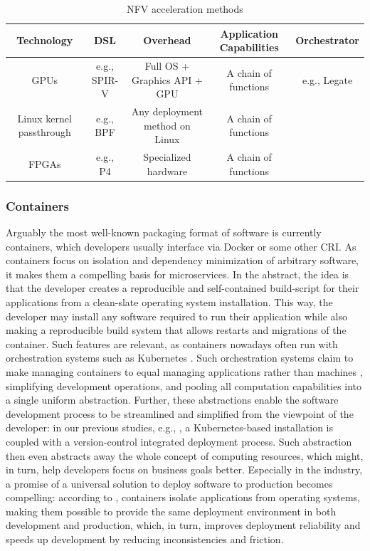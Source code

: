 \documentclass{IEEEtran}
\begin{document}
\begin{table}
\begin{center}
\caption{NFV acceleration methods}
\begin{tabular}{ c|c|c|c|c }
 Technology & DSL & Overhead & Application Capabilities & Orchestrator \\
 \hline
 GPUs & e.g., SPIR-V & Full OS + Graphics API + GPU & A chain of functions & e.g., Legate \cite{bauer2019legate} \\
 Linux kernel passthrough & e.g., BPF & Any deployment method on Linux & A chain of functions &  \\
 FPGAs & e.g., P4 & Specialized hardware & A chain of functions & \\
\end{tabular}
\end{center}
\end{table}

\subsubsection{Containers}

Arguably the most well-known packaging format of software is currently containers, which developers usually interface via Docker or some other \gls{CRI}. As containers focus on isolation and dependency minimization of arbitrary software, it makes them a compelling basis for microservices. In the abstract, the idea is that the developer creates a reproducible and self-contained build-script for their applications from a clean-slate operating system installation. This way, the developer may install any software required to run their application while also making a reproducible build system that allows restarts and migrations of the container. Such features are relevant, as containers nowadays often run with orchestration systems such as Kubernetes \cite{burns2016borg}. Such orchestration systems claim to make managing containers to equal managing applications rather than machines \cite{burns2016borg}, simplifying development operations, and pooling all computation capabilities into a single uniform abstraction. Further, these abstractions enable the software development process to be streamlined and simplified from the viewpoint of the developer: in our previous studies, e.g., \cite{haavisto2019open}, a Kubernetes-based installation is coupled with a version-control integrated deployment process. Such abstraction then even abstracts away the whole concept of computing resources, which might, in turn, help developers focus on business goals better. Especially in the industry, a promise of a universal solution to deploy software to production becomes compelling: according to \cite{burns2016borg}, containers isolate applications from operating systems, making them possible to provide the same deployment environment in both development and production, which, in turn, improves deployment reliability and speeds up development by reducing inconsistencies and friction.
\end{document}
